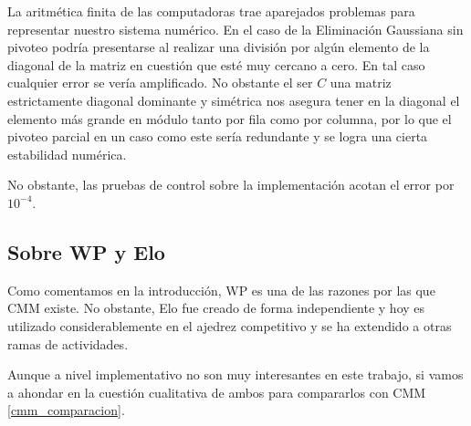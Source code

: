 La aritmética finita de las computadoras trae aparejados problemas para representar nuestro sistema numérico. En el caso de la Eliminación Gaussiana sin pivoteo podría presentarse al realizar una división por algún elemento de la diagonal de la matriz en cuestión que esté muy cercano a cero. En tal caso cualquier error se vería amplificado. No obstante el ser $C$ una matriz estrictamente diagonal dominante y simétrica nos asegura tener en la diagonal el elemento más grande en módulo tanto por fila como por columna, por lo que el pivoteo parcial en un caso como este sería redundante y se logra una cierta estabilidad numérica.

No obstante, las pruebas de control sobre la implementación acotan el error por $10^{-4}$.

\subsection{Sobre WP y Elo}

Como comentamos en la introducción, WP es una de las razones por las que CMM existe. No obstante, Elo fue creado de forma independiente y hoy es utilizado considerablemente en el ajedrez competitivo y se ha extendido a otras ramas de actividades.

Aunque a nivel implementativo no son muy interesantes en este trabajo, si vamos a ahondar en la cuestión cualitativa de ambos para compararlos con CMM \ref{cmm_comparacion}.